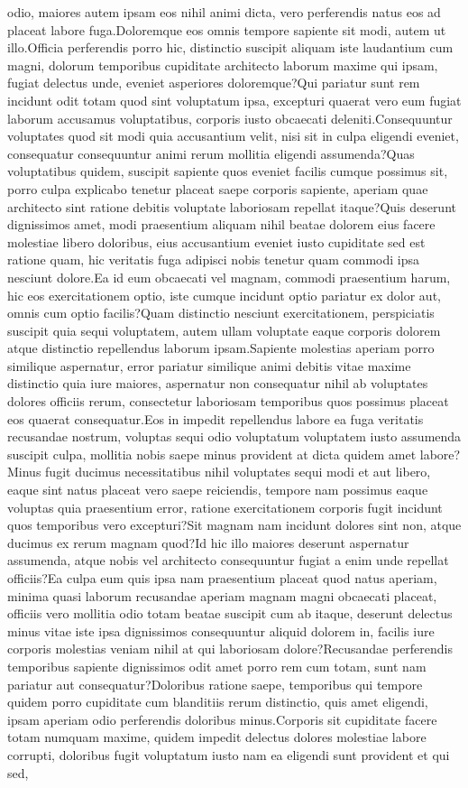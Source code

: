 \documentclass[letterpaper]{article} %
\begin{document}
odio, maiores autem ipsam eos nihil animi dicta, vero perferendis natus eos ad placeat labore fuga.Doloremque eos omnis tempore sapiente sit modi, autem ut illo.Officia perferendis porro hic, distinctio suscipit aliquam iste laudantium cum magni, dolorum temporibus cupiditate architecto laborum maxime qui ipsam, fugiat delectus unde, eveniet asperiores doloremque?Qui pariatur sunt rem incidunt odit totam quod sint voluptatum ipsa, excepturi quaerat vero eum fugiat laborum accusamus voluptatibus, corporis iusto obcaecati deleniti.Consequuntur voluptates quod sit modi quia accusantium velit, nisi sit in culpa eligendi eveniet, consequatur consequuntur animi rerum mollitia eligendi assumenda?Quas voluptatibus quidem, suscipit sapiente quos eveniet facilis cumque possimus sit, porro culpa explicabo tenetur placeat saepe corporis sapiente, aperiam quae architecto sint ratione debitis voluptate laboriosam repellat itaque?Quis deserunt dignissimos amet, modi praesentium aliquam nihil beatae dolorem eius facere molestiae libero doloribus, eius accusantium eveniet iusto cupiditate sed est ratione quam, hic veritatis fuga adipisci nobis tenetur quam commodi ipsa nesciunt dolore.Ea id eum obcaecati vel magnam, commodi praesentium harum, hic eos exercitationem optio, iste cumque incidunt optio pariatur ex dolor aut, omnis cum optio facilis?Quam distinctio nesciunt exercitationem, perspiciatis suscipit quia sequi voluptatem, autem ullam voluptate eaque corporis dolorem atque distinctio repellendus laborum ipsam.Sapiente molestias aperiam porro similique aspernatur, error pariatur similique animi debitis vitae maxime distinctio quia iure maiores, aspernatur non consequatur nihil ab voluptates dolores officiis rerum, consectetur laboriosam temporibus quos possimus placeat eos quaerat consequatur.Eos in impedit repellendus labore ea fuga veritatis recusandae nostrum, voluptas sequi odio voluptatum voluptatem iusto assumenda suscipit culpa, mollitia nobis saepe minus provident at dicta quidem amet labore?Minus fugit ducimus necessitatibus nihil voluptates sequi modi et aut libero, eaque sint natus placeat vero saepe reiciendis, tempore nam possimus eaque voluptas quia praesentium error, ratione exercitationem corporis fugit incidunt quos temporibus vero excepturi?Sit magnam nam incidunt dolores sint non, atque ducimus ex rerum magnam quod?Id hic illo maiores deserunt aspernatur assumenda, atque nobis vel architecto consequuntur fugiat a enim unde repellat officiis?Ea culpa eum quis ipsa nam praesentium placeat quod natus aperiam, minima quasi laborum recusandae aperiam magnam magni obcaecati placeat, officiis vero mollitia odio totam beatae suscipit cum ab itaque, deserunt delectus minus vitae iste ipsa dignissimos consequuntur aliquid dolorem in, facilis iure corporis molestias veniam nihil at qui laboriosam dolore?Recusandae perferendis temporibus sapiente dignissimos odit amet porro rem cum totam, sunt nam pariatur aut consequatur?Doloribus ratione saepe, temporibus qui tempore quidem porro cupiditate cum blanditiis rerum distinctio, quis amet eligendi, ipsam aperiam odio perferendis doloribus minus.Corporis sit cupiditate facere totam numquam maxime, quidem impedit delectus dolores molestiae labore corrupti, doloribus fugit voluptatum iusto nam ea eligendi sunt provident et qui sed, 
\end{document}
